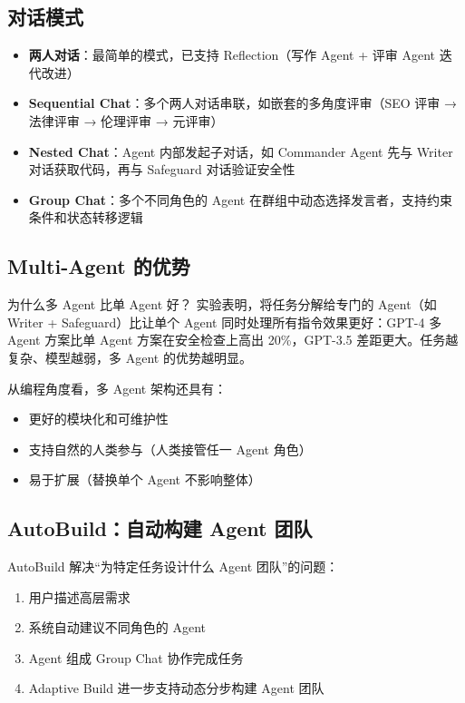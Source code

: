 \documentclass[a4paper]{article}
\begin{document}
\subsection{对话模式}

\begin{itemize}
    \item \textbf{两人对话}：最简单的模式，已支持 Reflection（写作 Agent + 评审 Agent 迭代改进）
    \item \textbf{Sequential Chat}：多个两人对话串联，如嵌套的多角度评审（SEO 评审 → 法律评审 → 伦理评审 → 元评审）
    \item \textbf{Nested Chat}：Agent 内部发起子对话，如 Commander Agent 先与 Writer 对话获取代码，再与 Safeguard 对话验证安全性
    \item \textbf{Group Chat}：多个不同角色的 Agent 在群组中动态选择发言者，支持约束条件和状态转移逻辑
\end{itemize}

\subsection{Multi-Agent 的优势}

\begin{importantbox}{为什么多 Agent 比单 Agent 好？}
实验表明，将任务分解给专门的 Agent（如 Writer + Safeguard）比让单个 Agent 同时处理所有指令效果更好：GPT-4 多 Agent 方案比单 Agent 方案在安全检查上高出 20\%，GPT-3.5 差距更大。任务越复杂、模型越弱，多 Agent 的优势越明显。
\end{importantbox}

从编程角度看，多 Agent 架构还具有：
\begin{itemize}
    \item 更好的模块化和可维护性
    \item 支持自然的人类参与（人类接管任一 Agent 角色）
    \item 易于扩展（替换单个 Agent 不影响整体）
\end{itemize}

\subsection{AutoBuild：自动构建 Agent 团队}

AutoBuild 解决``为特定任务设计什么 Agent 团队''的问题：
\begin{enumerate}
    \item 用户描述高层需求
    \item 系统自动建议不同角色的 Agent
    \item Agent 组成 Group Chat 协作完成任务
    \item Adaptive Build 进一步支持动态分步构建 Agent 团队
\end{enumerate}
\end{document}

